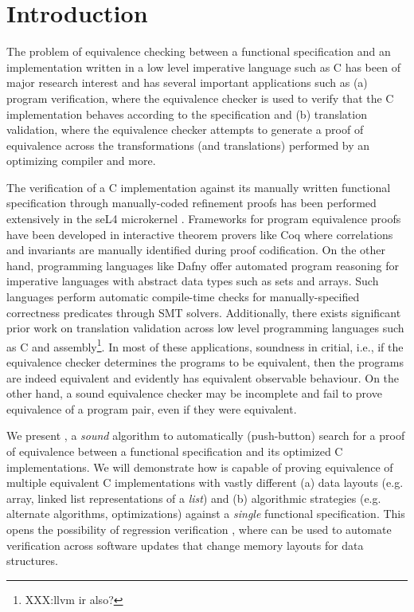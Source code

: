 \section{Introduction}
\label{sec:intro}
The problem of equivalence checking between a functional specification and an
implementation written in a low level imperative language such as C
has been of major research interest
and has several important applications such as (a) program verification, where
the equivalence checker is used to verify that the C implementation
behaves according to the specification and (b) translation validation, where
the equivalence checker attempts to generate a proof of equivalence across
the transformations (and translations) performed by an optimizing compiler
and more.

The verification of a C implementation against its manually written
functional specification through manually-coded refinement proofs has been
performed extensively in the seL4 microkernel \cite{seL4}.
Frameworks for program equivalence proofs have been developed in interactive
theorem provers like Coq \cite{programEquivalenceInCoq} where correlations and invariants
are manually identified during proof codification.
On the other hand, programming languages like Dafny \cite{dafny} offer automated program
reasoning for imperative languages with abstract data types such as sets and arrays.
Such languages perform automatic compile-time checks for manually-specified
correctness predicates through SMT solvers.
Additionally, there exists significant prior work on translation validation
\cite{tvi,tristan_tv_eqsat11,stepp_eqsat_llvm11,eqsat,pec,zuck03,zuck05,heffter05,covac,c_to_verilog,kanade09,lopes16,tvoc_cav05,ddec,semalign,oopsla20,tv_oskernel,namjoshi13}
across low level programming languages such as C and assembly\footnote{XXX:llvm ir also?}.
In most of these applications, soundness in critial,
i.e., if the equivalence checker determines the programs to be equivalent, then the programs are indeed equivalent
and evidently has equivalent observable behaviour. On the other hand, a sound equivalence checker may be incomplete
and fail to prove equivalence of a program pair, even if they were equivalent.

We present \toolName{}, a {\em sound} algorithm to automatically (push-button) search
for a proof of equivalence between a functional specification and its
optimized C implementations. We will demonstrate how \toolName{} is capable of
proving equivalence of multiple equivalent C implementations with vastly
different (a) data layouts (e.g. array, linked list representations of a {\em list})
and (b) algorithmic strategies (e.g. alternate algorithms, optimizations) against
a {\em single} functional specification.
This opens the possibility of regression verification \cite{strichman_regressverify,felsing14},
where \toolName{} can be used to automate verification across
software updates that change memory layouts for data structures.


